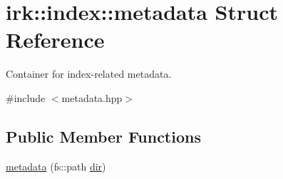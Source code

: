 \hypertarget{structirk_1_1index_1_1metadata}{}\section{irk\+:\+:index\+:\+:metadata Struct Reference}
\label{structirk_1_1index_1_1metadata}


Container for index-\/related metadata.  




{\ttfamily \#include $<$metadata.\+hpp$>$}

\subsection*{Public Member Functions}
\begin{DoxyCompactItemize}
\item 
\mbox{\hyperlink{structirk_1_1index_1_1metadata_a9d0e997a5145a95328519290af96326c}{metadata}} (fs\+::path \mbox{\hyperlink{structirk_1_1index_1_1metadata_a355b4325c022cd152e68fc18b1775fc6}{dir}})
\end{DoxyCompactItemize}
